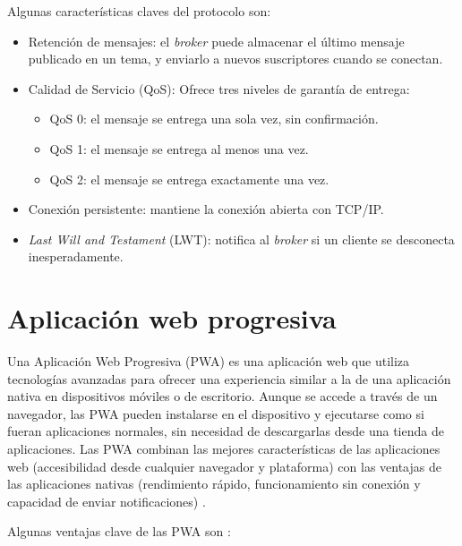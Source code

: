 Algunas características claves del protocolo son: 

\begin{itemize}
	\item Retención de mensajes: el \textit{broker} puede almacenar el último mensaje publicado en un tema, y enviarlo a nuevos suscriptores cuando se conectan.
	\item Calidad de Servicio (QoS): Ofrece tres niveles de garantía de entrega:
	\begin{itemize}
		\item QoS 0: el mensaje se entrega una sola vez, sin confirmación.
		\item QoS 1: el mensaje se entrega al menos una vez.
		\item QoS 2: el mensaje se entrega exactamente una vez.
	\end{itemize}
	\item Conexión persistente: mantiene la conexión abierta con TCP/IP.
	\item \textit{Last Will and Testament} (LWT): notifica al \textit{broker} si un cliente se desconecta inesperadamente.
\end{itemize}


\section{Aplicación web progresiva}

Una Aplicación Web Progresiva (PWA) es una aplicación web que utiliza tecnologías avanzadas para ofrecer una experiencia similar a la de una aplicación nativa en dispositivos móviles o de escritorio. Aunque se accede a través de un navegador, las PWA pueden instalarse en el dispositivo y ejecutarse como si fueran aplicaciones normales, sin necesidad de descargarlas desde una tienda de aplicaciones.
Las PWA combinan las mejores características de las aplicaciones web (accesibilidad desde cualquier navegador y plataforma) con las ventajas de las aplicaciones nativas (rendimiento rápido, funcionamiento sin conexión y capacidad de enviar notificaciones) \citep{pwamicrosoft} \citep{pwamozilla}.

Algunas ventajas clave de las PWA son \citep{pwaiebschool}:

